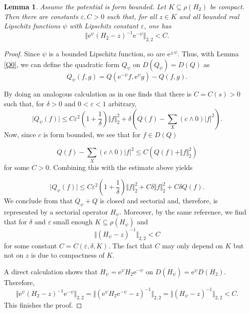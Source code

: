 \documentclass[10pt]{amsart}
\newtheorem{lemma}[theorem]{Lemma}
\theoremstyle{definition}
\begin{document}
\begin{lemma}\label{resolventbound} Assume  the potential is  form bounded.
    Let $K\subseteq\rho( H_2)$ be compact. Then there are constants $\varepsilon,C>0$ such that, for all $z\in K$ and all bounded real Lipschitz functions $\psi$ 
    with Lipschitz constant $\varepsilon$, 
    one has 
    \[\Vert\mathrm{e}^{\psi}( H_2-z)^{-1}\mathrm{e}^{-\psi}\Vert_{2,2}<C.\]
\end{lemma}
\begin{proof}
    Since $\psi$ is a bounded Lipschitz function, so are $\mathrm{e}^{\pm\psi}.$
    Thus, with Lemma \ref{Q0}, we can define the quadratic form 
    $Q_\psi$ on $D(Q_\psi) = D(Q)$ as
    \[Q_\psi(f,g) = Q(\mathrm{e}^{-\psi }f,\mathrm{e}^\psi g)-Q(f,g).\]

By doing an analogous calculation as in \cite[Lemma 4.1]{BauerHuaKeller} one finds that there is $C=C(s)>0$ such that,  for $\delta>0$ and $0<\varepsilon<1$ arbitrary, 
\[\vert Q_\psi (f)\vert \leq C\varepsilon^2\left(1+\frac{1}{\delta}\right)\Vert f\Vert^2_2+\delta \left(Q(f)-\sum_ X (c\wedge0)\vert f\vert^2\right).\]
Now, since $c$ is form bounded, we see that for $f\in D(Q)$

\[ Q(f) - \sum_X (c \wedge 0) \vert f\vert^2 \leq C (Q(f)+\Vert f\Vert^2_2)\] for some $C>0.$ Combining this with the estimate above yields 

\[\vert Q_\psi(f)\vert\leq C\varepsilon^2\left(1+\frac{1}{\delta}\right)\Vert f\Vert^2_2+C\delta\Vert f\Vert^2_2+C\delta Q(f).\] We conclude from \cite[Theorem VI 3.9]{K} that $Q_\psi+Q$ is closed and sectorial and, therefore, is represented by a sectorial operator $ H_\psi.$ Moreover, by the same reference, we find that for $\delta$ and $\varepsilon$ small enough $K\subseteq\rho( H_\psi)$ and 
\[\Vert ( H_\psi-z)^{-1}\Vert_{2,2}< C\] for some constant $C = C(\varepsilon,\delta, K).$ The fact that $C$ may only depend on $K$ but not on $z$ is due to compactness of $K.$



A direct calculation shows that $ H_\psi = \mathrm{e}^\psi H_2\mathrm{e}^{-\psi}$ on $D( H_\psi) = \mathrm{e}^\psi D( H_2).$
Therefore,\[ \Vert\mathrm{e}^{\psi}( H_2-z)^{-1}\mathrm{e}^{-\psi}\Vert_{2,2}=\Vert (\mathrm{e}^\psi H_2\mathrm{e}^{-\psi}-z)^{-1}\Vert_{2,2}=\Vert  ( H_\psi-z)^{-1}\Vert_{2,2} <C.\]
This finishes the proof.
\end{proof}
\end{document}
